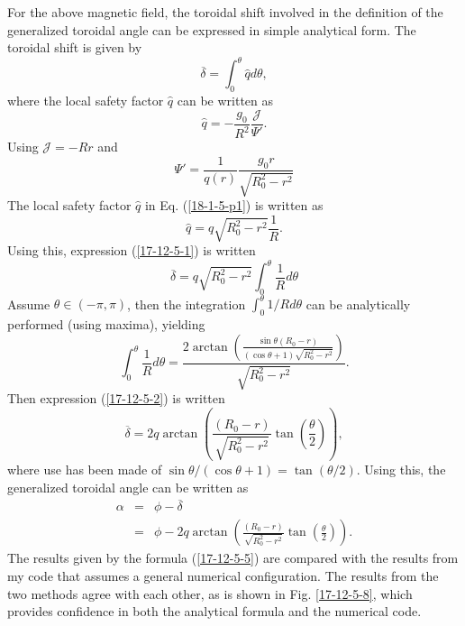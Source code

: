 \documentclass{article}
\begin{document}
For the above magnetic field, the toroidal shift involved in the definition of
the generalized toroidal angle can be expressed in simple analytical form. The
toroidal shift is given by
\begin{equation}
  \label{17-12-5-1} \overline{\delta} = \int_0^{\theta} \hat{q} d \theta,
\end{equation}
where the local safety factor $\hat{q}$ can be written as
\begin{equation}
  \label{18-1-5-p1} \hat{q} = - \frac{g_0}{R^2}  \frac{\mathcal{J}}{\Psi'} .
\end{equation}
Using $\mathcal{J} = - R r$ and
\begin{equation}
  \Psi' = \frac{1}{q (r)}  \frac{g_0 r}{\sqrt{R_0^2 - r^2}}
\end{equation}
The local safety factor $\hat{q}$ in Eq. (\ref{18-1-5-p1}) is written as
\begin{equation}
  \label{18-4-30-e1} \hat{q} = q \sqrt{R_0^2 - r^2} \frac{1}{R} .
\end{equation}
Using this, expression (\ref{17-12-5-1}) is written
\begin{equation}
  \label{17-12-5-2} \overline{\delta} = q \sqrt{R_0^2 - r^2} \int_0^{\theta}
  \frac{1}{R} d \theta
\end{equation}
Assume $\theta \in (- \pi, \pi)$, then the integration $\int_0^{\theta} 1 / R
d \theta$ can be analytically performed (using maxima), yielding
\begin{equation}
  \int_0^{\theta} \frac{1}{R} d \theta = \frac{2 \arctan \left( \frac{\sin
  \theta (R_0 - r)}{(\cos \theta + 1) \sqrt{R_0^2 - r^2}} \right)}{\sqrt{R_0^2
  - r^2}} .
\end{equation}
Then expression (\ref{17-12-5-2}) is written
\begin{equation}
  \label{17-12-5-5} \overline{\delta} = 2 q \arctan \left( \frac{(R_0 -
  r)}{\sqrt{R_0^2 - r^2}} \tan \left( \frac{\theta}{2} \right) \right),
\end{equation}
where use has been made of $\sin \theta / (\cos \theta + 1) = \tan (\theta /
2)$. Using this, the generalized toroidal angle can be written as
\begin{eqnarray}
  \alpha & = & \phi - \overline{\delta} \nonumber\\
  & = & \phi - 2 q \arctan \left( \frac{(R_0 - r)}{\sqrt{R_0^2 - r^2}} \tan
  \left( \frac{\theta}{2} \right) \right) .  \label{18-9-11-a1}
\end{eqnarray}
The results given by the formula (\ref{17-12-5-5}) are compared with the
results from my code that assumes a general numerical configuration. The
results from the two methods agree with each other, as is shown in Fig.
\ref{17-12-5-8}, which provides confidence in both the analytical formula and
the numerical code.
\end{document}
